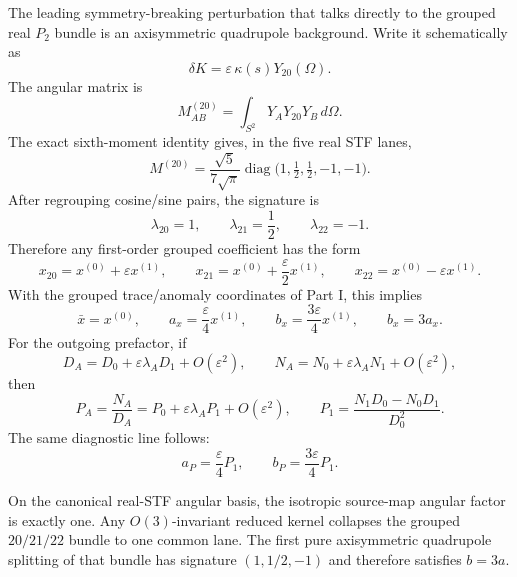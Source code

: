 The leading symmetry-breaking perturbation that talks directly to the grouped real \(P_2\) bundle is an axisymmetric quadrupole background.  Write it schematically as
\begin{equation}
\delta K=\varepsilon\,\kappa(s)Y_{20}(\Omega).
\end{equation}
The angular matrix is
\begin{equation}
M_{AB}^{(20)}=\int_{S^2}Y_A Y_{20}Y_B\,d\Omega.
\end{equation}
The exact sixth-moment identity gives, in the five real STF lanes,
\begin{equation}
\label{eq:part02-axisym-matrix}
\boxed{
M^{(20)}=\frac{\sqrt5}{7\sqrt\pi}
\operatorname{diag}\!\bigl(1,\tfrac12,\tfrac12,-1,-1\bigr)}.
\end{equation}
After regrouping cosine/sine pairs, the signature is
\begin{equation}
\label{eq:part02-axisym-lambda}
\boxed{
\lambda_{20}=1,
\qquad
\lambda_{21}=\frac12,
\qquad
\lambda_{22}=-1}.
\end{equation}
Therefore any first-order grouped coefficient has the form
\begin{equation}
\label{eq:part02-axisym-coeff}
x_{20}=x^{(0)}+\varepsilon x^{(1)},
\qquad
x_{21}=x^{(0)}+\frac{\varepsilon}{2}x^{(1)},
\qquad
x_{22}=x^{(0)}-\varepsilon x^{(1)}.
\end{equation}
With the grouped trace/anomaly coordinates of Part I, this implies
\begin{equation}
\label{eq:part02-b-equals-3a}
\boxed{
\bar x=x^{(0)},
\qquad
a_x=\frac{\varepsilon}{4}x^{(1)},
\qquad
b_x=\frac{3\varepsilon}{4}x^{(1)},
\qquad
b_x=3a_x}.
\end{equation}
For the outgoing prefactor, if
\begin{equation}
D_A=D_0+\varepsilon\lambda_A D_1+O(\varepsilon^2),
\qquad
N_A=N_0+\varepsilon\lambda_A N_1+O(\varepsilon^2),
\end{equation}
then
\begin{equation}
\label{eq:part02-P1-axisym}
P_A=\frac{N_A}{D_A}
=P_0+\varepsilon\lambda_A P_1+O(\varepsilon^2),
\qquad
\boxed{
P_1=\frac{N_1D_0-N_0D_1}{D_0^2}}.
\end{equation}
The same diagnostic line follows:
\begin{equation}
\label{eq:part02-P-axisym-defects}
a_P=\frac{\varepsilon}{4}P_1,
\qquad
b_P=\frac{3\varepsilon}{4}P_1.
\end{equation}

\begin{theorem}
\label{thm:part02-angular-isotropy}
On the canonical real-STF angular basis, the isotropic source-map angular factor is exactly one.  Any \(O(3)\)-invariant reduced kernel collapses the grouped \(20/21/22\) bundle to one common lane.  The first pure axisymmetric quadrupole splitting of that bundle has signature \((1,1/2,-1)\) and therefore satisfies \(b=3a\).
\end{theorem}


